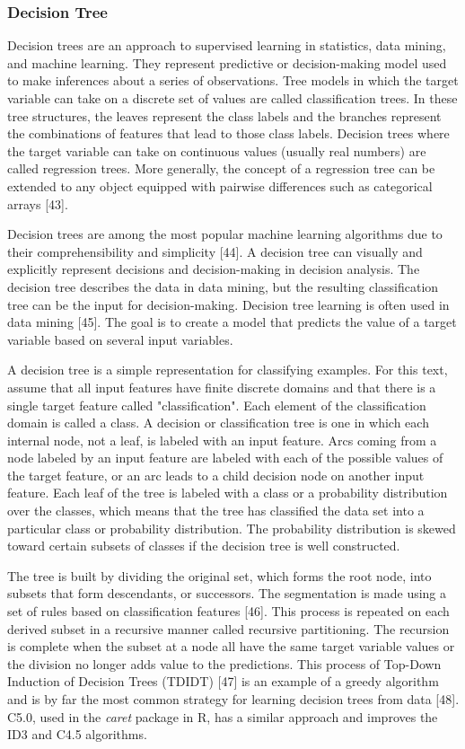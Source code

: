 \documentclass[preprint,12pt]{elsarticle}
\begin{document}
\subsubsection{Decision Tree}

Decision trees are an approach to supervised learning in statistics, data mining, and machine learning. They represent predictive or decision-making model used to make inferences about a series of observations. Tree models in which the target variable can take on a discrete set of values are called classification trees. In these tree structures, the leaves represent the class labels and the branches represent the combinations of features that lead to those class labels. Decision trees where the target variable can take on continuous values (usually real numbers) are called regression trees. More generally, the concept of a regression tree can be extended to any object equipped with pairwise differences such as categorical arrays [43].

Decision trees are among the most popular machine learning algorithms due to their comprehensibility and simplicity [44]. A decision tree can visually and explicitly represent decisions and decision-making in decision analysis. The decision tree describes the data in data mining, but the resulting classification tree can be the input for decision-making. Decision tree learning is often used in data mining [45]. The goal is to create a model that predicts the value of a target variable based on several input variables.

A decision tree is a simple representation for classifying examples. For this text, assume that all input features have finite discrete domains and that there is a single target feature called "classification". Each element of the classification domain is called a class. A decision or classification tree is one in which each internal node, not a leaf, is labeled with an input feature. Arcs coming from a node labeled by an input feature are labeled with each of the possible values of the target feature, or an arc leads to a child decision node on another input feature. Each leaf of the tree is labeled with a class or a probability distribution over the classes, which means that the tree has classified the data set into a particular class or probability distribution. The probability distribution is skewed toward certain subsets of classes if the decision tree is well constructed.

The tree is built by dividing the original set, which forms the root node, into subsets that form descendants, or successors. The segmentation is made using a set of rules based on classification features [46]. This process is repeated on each derived subset in a recursive manner called recursive partitioning. The recursion is complete when the subset at a node all have the same target variable values or the division no longer adds value to the predictions. This process of Top-Down Induction of Decision Trees (TDIDT) [47] is an example of a greedy algorithm and is by far the most common strategy for learning decision trees from data [48]. C5.0, used in the \textit{caret} package in R, has a similar approach and improves the ID3 and C4.5 algorithms.
\end{document}
